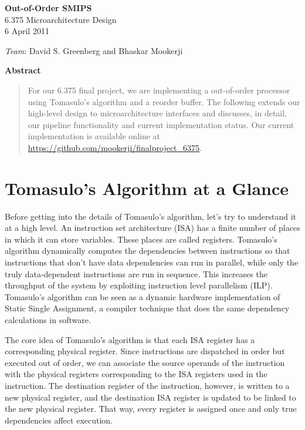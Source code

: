 \documentclass[12pt]{article}
\begin{document}
  \begin{center}
    \textbf{\large Out-of-Order SMIPS} \\
    6.375 Microarchitecture Design\\
    6 April 2011 \\
    
    \vspace{\baselineskip}
    
    \emph{Team}: David S. Greenberg and Bhaskar Mookerji
  \end{center}
  
  \begin{center}
      \textbf{Abstract}
  \end{center}
  \begin{quotation}
      For our 6.375 final project, we are implementing a out-of-order processor using Tomasulo's algorithm and 
      a reorder buffer. The following extends our high-level design to microarchitecture interfaces and 
      discusses, in detail, our pipeline functionality and current implementation status. Our current 
      implementation is available online at \url{https://github.com/mookerji/finalproject_6375}.
  \end{quotation}

\section{Tomasulo's Algorithm at a Glance}

Before getting into the details of Tomasulo's algorithm, let's try to understand it at a high level. An instruction set architecture (ISA) has a finite number of places in which
it can store variables. These places are called registers. Tomasulo's algorithm dynamically computes the dependencies between instructions so that instructions that
don't have data dependencies can run in parallel, while only the truly data-dependent instructions are run in sequence. This increases the throughput of the system by exploiting
instruction level parallelism (ILP). Tomasulo's algorithm can be seen as a dynamic hardware implementation of Static Single Assignment, a compiler technique that does
the same dependency calculations in software.

The core idea of Tomasulo's algorithm is that each ISA register has a corresponding physical register. Since instructions are dispatched in order but executed out of order,
we can associate the source operands of the instruction with the physical registers corresponding to the ISA registers used in the instruction. The destination register of
the instruction, however, is written to a new physical register, and the destination ISA register is updated to be linked to the new physical register. That way, every 
register is assigned once and only true dependencies affect execution.
\end{document}
